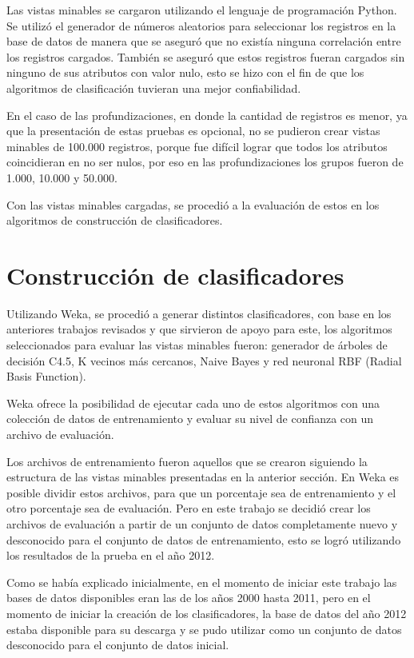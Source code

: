 Las vistas minables se cargaron utilizando el lenguaje de programación Python. Se utilizó el generador de números aleatorios para seleccionar los registros en la base de datos de manera que se aseguró que no existía ninguna correlación entre los registros cargados. También se aseguró que estos registros fueran cargados sin ninguno de sus atributos con valor nulo, esto se hizo con el fin de que los algoritmos de clasificación tuvieran una mejor confiabilidad.

En el caso de las profundizaciones, en donde la cantidad de registros es menor, ya que la presentación de estas pruebas es opcional, no se pudieron crear vistas minables de 100.000 registros, porque fue difícil lograr que todos los atributos coincidieran en no ser nulos, por eso en las profundizaciones los grupos fueron de 1.000, 10.000 y 50.000.

Con las vistas minables cargadas, se procedió a la evaluación de estos en los algoritmos de construcción de clasificadores.
\section{Construcción de clasificadores}
Utilizando Weka, se procedió a generar distintos clasificadores, con base en los anteriores trabajos revisados y que sirvieron de apoyo para este, los algoritmos seleccionados para evaluar las vistas minables fueron: generador de árboles de decisión C4.5\cite{key-170}, K vecinos más cercanos\cite{key-180}, Naive Bayes\cite{key-190} y red neuronal RBF (Radial Basis Function)\cite{key-200}.

Weka ofrece la posibilidad de ejecutar cada uno de estos algoritmos con una colección de datos de entrenamiento y evaluar su nivel de confianza con un archivo de evaluación.

Los archivos de entrenamiento fueron aquellos que se crearon siguiendo la estructura de las vistas minables presentadas en la anterior sección. En Weka es posible dividir estos archivos, para que un porcentaje sea de entrenamiento y el otro porcentaje sea de evaluación. Pero en este trabajo se decidió crear los archivos de evaluación a partir de un conjunto de datos completamente nuevo y desconocido para el conjunto de datos de entrenamiento, esto se logró utilizando los resultados de la prueba en el año 2012. 

Como se había explicado inicialmente, en el momento de iniciar este trabajo las bases de datos disponibles eran las de los años 2000 hasta 2011, pero en el momento de iniciar la creación de los clasificadores, la base de datos del año 2012 estaba disponible para su descarga y se pudo utilizar como un conjunto de datos desconocido para el conjunto de datos inicial.

